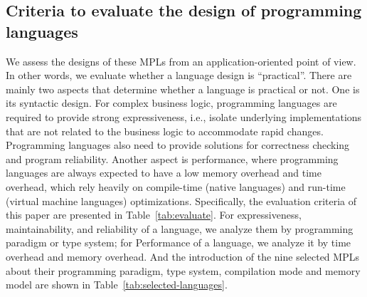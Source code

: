
\subsection{Criteria to evaluate the design of programming languages}




We assess the designs of these MPLs from an application-oriented point of view.
In other words, we evaluate whether a language design is “practical”.
There are mainly two aspects that determine whether a language is practical or not.
One is its syntactic design.
For complex business logic, programming languages are required to provide strong expressiveness,
i.e., isolate underlying implementations that are not related to the business logic to
accommodate rapid changes.
Programming languages also need to provide solutions for correctness checking and program reliability.
Another aspect is performance, where programming languages are always expected to have
a low memory overhead and time overhead, which rely heavily on compile-time (native languages)
and run-time (virtual machine languages) optimizations.
Specifically, the evaluation criteria of this paper are presented in Table~\ref{tab:evaluate}.
For expressiveness, maintainability, and reliability of a language, we analyze them
by programming paradigm or type system;
for Performance of a language, we analyze it by time overhead and memory overhead.
And the introduction of the nine selected MPLs about their programming paradigm,
type system, compilation mode and memory model are shown in Table~\ref{tab:selected-languages}.

